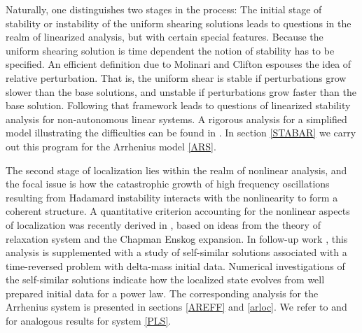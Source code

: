 \documentclass[a4paper,11pt]{article}
\theoremstyle{remark}
\begin{document}
Naturally, one distinguishes two stages in the process: The initial stage of stability or instability 
of the uniform shearing solutions leads to questions in the realm of linearized analysis, but with
certain special features. Because the uniform shearing solution
is time dependent the notion of stability has to be specified. An efficient definition due to
Molinari and Clifton \cite{MC,FM} espouses the idea of relative perturbation. That is, the uniform shear
is stable if perturbations grow slower than the base solutions, and unstable if perturbations grow
faster than the base solution. Following that framework leads to questions of linearized stability analysis 
for non-autonomous linear systems.
A rigorous analysis for a simplified model illustrating the difficulties can be found in \cite{Tzavaras92}.
In section \ref{STABAR}  we carry out this program for the Arrhenius model \eqref{ARS}.


The second stage of localization lies within the realm of nonlinear analysis, and the focal issue is how the catastrophic growth of high frequency oscillations resulting from Hadamard instability interacts with
the nonlinearity to form a coherent structure.
A quantitative criterion accounting for the nonlinear aspects of localization was recently derived in \cite{KT},
based on ideas from the theory of relaxation system and the Chapman Enskog expansion. In follow-up 
work \cite{KT2}, this analysis is supplemented with a study of self-similar
solutions associated with a time-reversed problem with delta-mass initial data. 
Numerical investigations of the self-similar solutions indicate how the localized state evolves 
from well prepared initial data for a  power law. The corresponding analysis for the Arrhenius system 
is presented in sections \ref{AREFF} and \ref{arloc}. 
We refer to \cite{KT} and \cite{KT2} for analogous results for system \eqref{PLS}.

%
%
\end{document}
